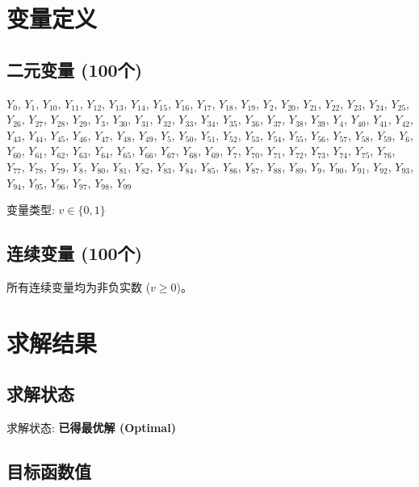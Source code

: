 \documentclass[a4paper,10pt]{article}
\begin{document}
\section{变量定义}

\subsection{二元变量 (100个)}

{\small $Y_{0}$, $Y_{1}$, $Y_{10}$, $Y_{11}$, $Y_{12}$, $Y_{13}$, $Y_{14}$, $Y_{15}$, $Y_{16}$, $Y_{17}$, $Y_{18}$, $Y_{19}$, $Y_{2}$, $Y_{20}$, $Y_{21}$, $Y_{22}$, $Y_{23}$, $Y_{24}$, $Y_{25}$, $Y_{26}$, $Y_{27}$, $Y_{28}$, $Y_{29}$, $Y_{3}$, $Y_{30}$, $Y_{31}$, $Y_{32}$, $Y_{33}$, $Y_{34}$, $Y_{35}$, $Y_{36}$, $Y_{37}$, $Y_{38}$, $Y_{39}$, $Y_{4}$, $Y_{40}$, $Y_{41}$, $Y_{42}$, $Y_{43}$, $Y_{44}$, $Y_{45}$, $Y_{46}$, $Y_{47}$, $Y_{48}$, $Y_{49}$, $Y_{5}$, $Y_{50}$, $Y_{51}$, $Y_{52}$, $Y_{53}$, $Y_{54}$, $Y_{55}$, $Y_{56}$, $Y_{57}$, $Y_{58}$, $Y_{59}$, $Y_{6}$, $Y_{60}$, $Y_{61}$, $Y_{62}$, $Y_{63}$, $Y_{64}$, $Y_{65}$, $Y_{66}$, $Y_{67}$, $Y_{68}$, $Y_{69}$, $Y_{7}$, $Y_{70}$, $Y_{71}$, $Y_{72}$, $Y_{73}$, $Y_{74}$, $Y_{75}$, $Y_{76}$, $Y_{77}$, $Y_{78}$, $Y_{79}$, $Y_{8}$, $Y_{80}$, $Y_{81}$, $Y_{82}$, $Y_{83}$, $Y_{84}$, $Y_{85}$, $Y_{86}$, $Y_{87}$, $Y_{88}$, $Y_{89}$, $Y_{9}$, $Y_{90}$, $Y_{91}$, $Y_{92}$, $Y_{93}$, $Y_{94}$, $Y_{95}$, $Y_{96}$, $Y_{97}$, $Y_{98}$, $Y_{99}$}

变量类型: $v \in \{0,1\}$

\subsection{连续变量 (100个)}

所有连续变量均为非负实数 ($v \geq 0$)。

\section{求解结果}

\subsection{求解状态}

求解状态: \textbf{已得最优解 (Optimal)}

\subsection{目标函数值}
\end{document}

